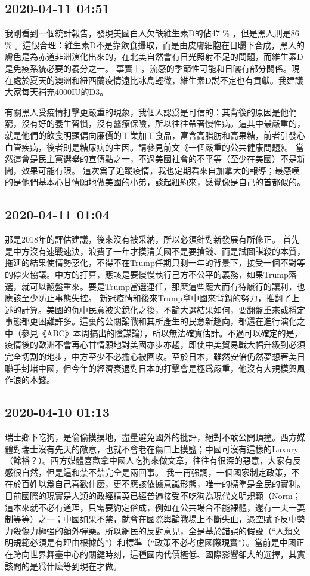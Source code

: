 \documentclass[twocolumn]{ctexart}
\begin{document}
\subsection*{2020-04-11 04:51}

我剛看到一個統計報告，發現美國白人欠缺維生素D的佔47 \% ，但是黑人則是86 \% 。這很合理：維生素D不是靠飲食攝取，而是由皮膚細胞在日曬下合成，黑人的膚色是為赤道非洲演化出來的，在北美自然會有日光照射不足的問題，而維生素D是免疫系統必要的養分之一。
事實上，流感的季節性可能和日曬有部分關係。現在處於夏天的澳洲和紐西蘭疫情遠比冰島輕微，維生素D説不定也有貢獻。我建議大家每天補充4000IU的D3。

有關黑人受疫情打擊更嚴重的現象，我個人認爲是可信的：其背後的原因是他們窮，沒有好的養生習慣，沒有醫療保險，所以往往帶著慢性病。這其中最嚴重的，就是他們的飲食明顯偏向廉價的工業加工食品，富含高脂肪和高果糖，前者引發心血管疾病，後者則是糖尿病的主因。請參見前文《一個嚴重的公共健康問題》。
當然這會是民主黨選舉的宣傳點之一，不過美國社會的不平等（至少在美國）不是新聞，效果可能有限。
這次爲了追蹤疫情，我也定期看來自加拿大的報導；最感嘆的是他們基本心甘情願地做美國的小弟，談起紐約來，感覺像是自己的首都似的。
\subsection*{2020-04-11 01:04}

那是2018年的評估建議，後來沒有被采納，所以必須針對新發展有所修正。
首先是中方沒有速戰速決，浪費了一年才摸清美國不是要搶錢、而是試圖謀殺的本質，拖延的結果使情勢惡化，不得不在Trump任期只剩一年的背景下，接受一個不對等的停火協議。中方的打算，應該是要慢慢執行己方不公平的義務，如果Trump落選，就可以翻盤重來。要是Trump當選連任，那麽這些龐大而有待履行的讓利，也應該至少防止事態失控。
新冠疫情和後來Trump拿中國來背鍋的努力，推翻了上述的計算。美國的仇中民意被尖銳化之後，不論大選結果如何，要翻盤重來或穩定事態都更困難許多。這裏的公關論戰和其所產生的民意新趨向，都還在進行演化之中（參見《ABC》本周搞出的陰謀論），所以無法確實估計。不過可以確定的是，疫情後的歐洲不會再心甘情願地對美國亦步亦趨，即使中美貿易戰大幅升級到必須完全切割的地步，中方至少不必擔心被圍攻。至於日本，雖然安倍仍然夢想著美日聯手封堵中國，但今年的經濟衰退對日本的打擊會是極爲嚴重，他沒有大規模興風作浪的本錢。
\subsection*{2020-04-10 01:13}

瑞士鄉下吃狗，是偷偷摸摸地，盡量避免國外的批評，絕對不敢公開頂撞。西方媒體對瑞士沒有先天的敵意，也就不會老在傷口上摸鹽；中國可沒有這樣的Luxury（餘裕？）。西方媒體喜歡拿中國人吃狗來做文章，往往有很深的惡意，大家有反感很自然，但是這和禁不禁完全是兩回事。
我一再强調，一個國家制定政策，不在於百姓以爲自己喜歡什麽，更不應該依據意識形態，唯一的標準是全民的實利。目前國際的現實是人類的政經精英已經普遍接受不吃狗為現代文明規範（Norm；這本來就不必有道理，只需要約定俗成，例如在公共場合不能裸體，還有一夫一妻制等等）之一；中國如果不禁，就會在國際輿論戰場上不斷失血，憑空賦予反中勢力殺傷力極强的額外彈藥。所以網民的反對意見，全是基於錯誤的假設（“人類文明規範必須是有理由根據的”）和標準（“政策不必考慮國際現實”）。當前是中國正在跨向世界舞臺中心的關鍵時刻，這種國内代價極低、國際影響卻大的選擇，其實該問的是爲什麽等到現在才做。
\end{document}
